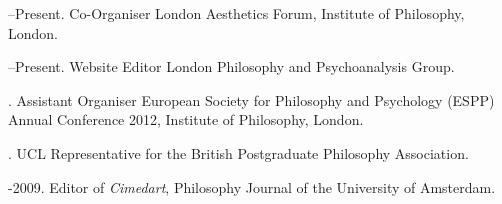 \documentclass[11pt]{article}
\begin{document}
--Present. Co-Organiser London Aesthetics Forum, Institute of Philosophy, London.

--Present. Website Editor London Philosophy and Psychoanalysis Group.

. Assistant Organiser European Society for Philosophy and Psychology (ESPP) Annual Conference 2012, Institute of Philosophy, London. 

. UCL Representative for the British Postgraduate Philosophy Association.

-2009. Editor of \emph{Cimedart}, Philosophy Journal of the University of Amsterdam.


% 
%  
% 
%  
% 
% 
% 
% 
% 
% 
% 
\end{document}
